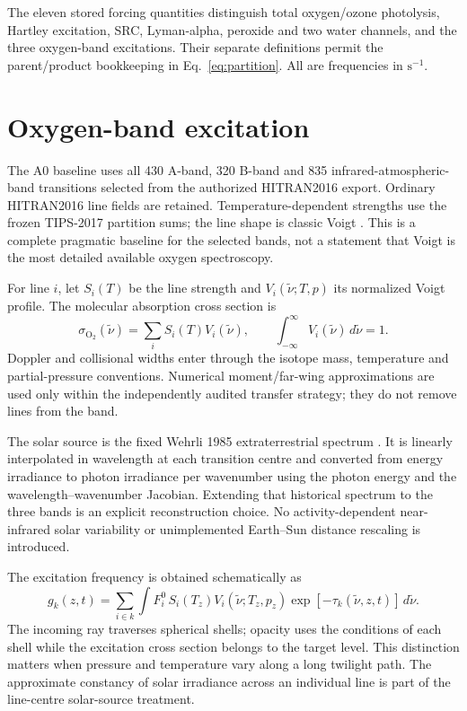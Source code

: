 The eleven stored forcing quantities distinguish total oxygen/ozone photolysis, Hartley excitation, SRC, Lyman-alpha, peroxide and two water channels, and the three oxygen-band excitations. Their separate definitions permit the parent/product bookkeeping in Eq.~\eqref{eq:partition}. All are frequencies in $\mathrm{s^{-1}}$.

\section{Oxygen-band excitation}
The A0 baseline uses all 430 A-band, 320 B-band and 835 infrared-atmospheric-band transitions selected from the authorized HITRAN2016 export. Ordinary HITRAN2016 line fields are retained. Temperature-dependent strengths use the frozen TIPS-2017 partition sums; the line shape is classic Voigt \citep{hitran2016,tips2017}. This is a complete pragmatic baseline for the selected bands, not a statement that Voigt is the most detailed available oxygen spectroscopy.

For line $i$, let $S_i(T)$ be the line strength and $V_i(\tilde\nu;T,p)$ its normalized Voigt profile. The molecular absorption cross section is
\begin{equation}\sigma_{\mathrm{O_2}}(\tilde\nu)=\sum_i S_i(T)V_i(\tilde\nu),\qquad
\int_{-\infty}^{\infty}V_i(\tilde\nu)\,d\tilde\nu=1.\label{eq:Voigt}\end{equation}
Doppler and collisional widths enter through the isotope mass, temperature and partial-pressure conventions. Numerical moment/far-wing approximations are used only within the independently audited transfer strategy; they do not remove lines from the band.

The solar source is the fixed Wehrli 1985 extraterrestrial spectrum \citep{wehrli1985}. It is linearly interpolated in wavelength at each transition centre and converted from energy irradiance to photon irradiance per wavenumber using the photon energy and the wavelength--wavenumber Jacobian. Extending that historical spectrum to the three bands is an explicit reconstruction choice. No activity-dependent near-infrared solar variability or unimplemented Earth--Sun distance rescaling is introduced.

The excitation frequency is obtained schematically as
\begin{equation}g_k(z,t)=\sum_{i\in k}\int F_i^0\,S_i(T_z)V_i(\tilde\nu;T_z,p_z)
\exp[-\tau_k(\tilde\nu,z,t)]\,d\tilde\nu.\label{eq:gfactor}\end{equation}
The incoming ray traverses spherical shells; opacity uses the conditions of each shell while the excitation cross section belongs to the target level. This distinction matters when pressure and temperature vary along a long twilight path. The approximate constancy of solar irradiance across an individual line is part of the line-centre solar-source treatment.

